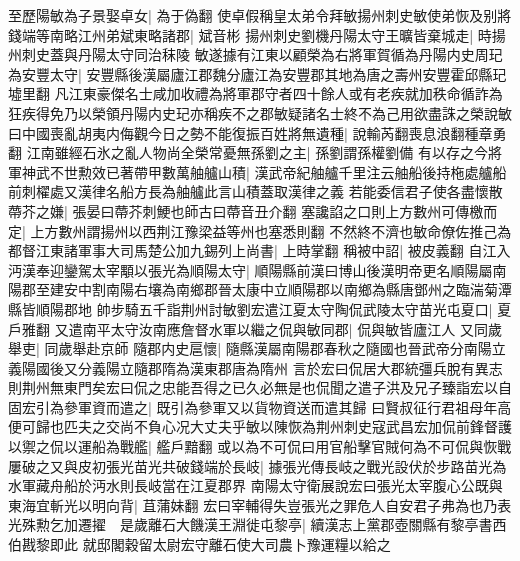 至歷陽敏為子景娶卓女|{
	為于偽翻}
使卓假稱皇太弟令拜敏揚州刺史敏使弟恢及别將錢端等南略江州弟斌東略諸郡|{
	斌音彬}
揚州刺史劉機丹陽太守王曠皆棄城走|{
	時揚州刺史蓋與丹陽太守同治秣陵}
敏遂據有江東以顧榮為右將軍賀循為丹陽内史周玘為安豐太守|{
	安豐縣後漢屬廬江郡魏分廬江為安豐郡其地為唐之壽州安豐霍邱縣玘墟里翻}
凡江東豪傑名士咸加收禮為將軍郡守者四十餘人或有老疾就加秩命循詐為狂疾得免乃以榮領丹陽内史玘亦稱疾不之郡敏疑諸名士終不為己用欲盡誅之榮說敏曰中國喪亂胡夷内侮觀今日之勢不能復振百姓將無遺種|{
	說輸芮翻喪息浪翻種章勇翻}
江南雖經石氷之亂人物尚全榮常憂無孫劉之主|{
	孫劉謂孫權劉備}
有以存之今將軍神武不世勲效已著帶甲數萬舳艫山積|{
	漢武帝紀舳艫千里注云舳船後持柂處艫船前刺櫂處又漢律名船方長為舳艫此言山積蓋取漢律之義}
若能委信君子使各盡懷散蔕芥之嫌|{
	張晏曰蔕芥刺鯁也師古曰蔕音丑介翻}
塞讒諂之口則上方數州可傳檄而定|{
	上方數州謂揚州以西荆江豫梁益等州也塞悉則翻}
不然終不濟也敏命僚佐推己為都督江東諸軍事大司馬楚公加九錫列上尚書|{
	上時掌翻}
稱被中詔|{
	被皮義翻}
自江入沔漢奉迎鑾駕太宰顒以張光為順陽太守|{
	順陽縣前漢曰博山後漢明帝更名順陽屬南陽郡至建安中割南陽右壤為南鄉郡晉太康中立順陽郡以南鄉為縣唐鄧州之臨湍菊潭縣皆順陽郡地}
帥步騎五千詣荆州討敏劉宏遣江夏太守陶侃武陵太守苗光屯夏口|{
	夏戶雅翻}
又遣南平太守汝南應詹督水軍以繼之侃與敏同郡|{
	侃與敏皆廬江人}
又同歲舉吏|{
	同歲舉赴京師}
隨郡内史扈懷|{
	隨縣漢屬南陽郡春秋之隨國也晉武帝分南陽立義陽國後又分義陽立隨郡隋為漢東郡唐為隋州}
言於宏曰侃居大郡統彊兵脫有異志則荆州無東門矣宏曰侃之忠能吾得之已久必無是也侃聞之遣子洪及兄子臻詣宏以自固宏引為參軍資而遣之|{
	既引為參軍又以貨物資送而遣其歸}
曰賢叔征行君祖母年高便可歸也匹夫之交尚不負心况大丈夫乎敏以陳恢為荆州刺史寇武昌宏加侃前鋒督護以禦之侃以運船為戰艦|{
	艦戶黯翻}
或以為不可侃曰用官船擊官賊何為不可侃與恢戰屢破之又與皮初張光苗光共破錢端於長岐|{
	據張光傳長岐之戰光設伏於步路苗光為水軍藏舟船於沔水則長岐當在江夏郡界}
南陽太守衛展說宏曰張光太宰腹心公既與東海宜斬光以明向背|{
	苴蒲妹翻}
宏曰宰輔得失豈張光之罪危人自安君子弗為也乃表光殊勲乞加遷擢　是歲離石大饑漢王淵徙屯黎亭|{
	續漢志上黨郡壺關縣有黎亭書西伯戡黎即此}
就邸閣穀留太尉宏守離石使大司農卜豫運糧以給之


